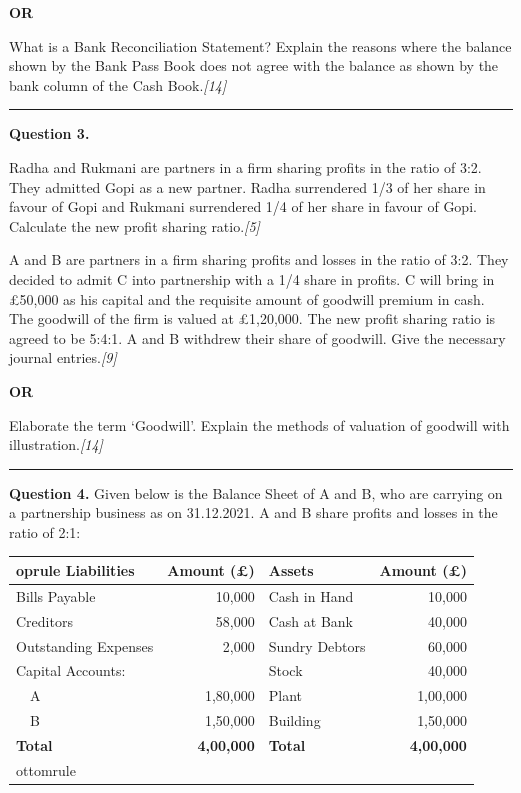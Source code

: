 \documentclass[11pt,a4paper]{article}
\newcommand{\pts}[1]{\hfill   \textit{[#1]}}
\begin{document}
\centerline{   \textbf{OR}}

What is a Bank Reconciliation Statement? Explain the reasons where the balance shown by the Bank Pass Book does not agree with the balance as shown by the bank column of the Cash Book.\pts{14}

\medskip\rule{\linewidth}{0.2pt}


\newpage




\noindent   \textbf{Question 3.}

\begin{parts}
  \item Radha and Rukmani are partners in a firm sharing profits in the ratio of 3:2. They admitted Gopi as a new partner. Radha surrendered 1/3 of her share in favour of Gopi and Rukmani surrendered 1/4 of her share in favour of Gopi. Calculate the new profit sharing ratio.\pts{5}
  \item A and B are partners in a firm sharing profits and losses in the ratio of 3:2. They decided to admit C into partnership with a 1/4 share in profits. C will bring in \pounds 50,000 as his capital and the requisite amount of goodwill premium in cash. The goodwill of the firm is valued at \pounds 1,20,000. The new profit sharing ratio is agreed to be 5:4:1. A and B withdrew their share of goodwill. Give the necessary journal entries.\pts{9}
\end{parts}

\centerline{   \textbf{OR}}

Elaborate the term `Goodwill'. Explain the methods of valuation of goodwill with illustration.\pts{14}

\medskip\rule{\linewidth}{0.2pt}




\noindent   \textbf{Question 4.}
Given below is the Balance Sheet of A and B, who are carrying on a partnership business as on 31.12.2021. A and B share profits and losses in the ratio of 2:1:


\begin{center}

\begin{tabular}{lr|lr}
 oprule
   \textbf{Liabilities} &   \textbf{Amount (\pounds)} &   \textbf{Assets} &   \textbf{Amount (\pounds)} \\
\midrule
Bills Payable & 10,000 & Cash in Hand & 10,000 \\
Creditors & 58,000 & Cash at Bank & 40,000 \\
Outstanding Expenses & 2,000 & Sundry Debtors & 60,000 \\
Capital Accounts: & & Stock & 40,000 \\
~~A & 1,80,000 & Plant & 1,00,000 \\
~~B & 1,50,000 & Building & 1,50,000 \\
\midrule
   \textbf{Total} &   \textbf{4,00,000} &   \textbf{Total} &   \textbf{4,00,000} \\
ottomrule
\end{tabular}
\end{center}
\end{document}
